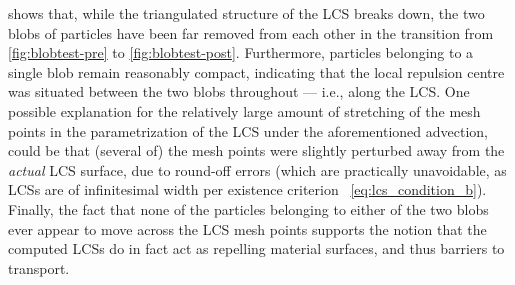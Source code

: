 

 shows that, while the triangulated structure of the LCS
breaks down, the two blobs of particles have been far removed from each other
in the transition from \cref{fig:blobtest-pre} to \cref{fig:blobtest-post}.
Furthermore, particles belonging to a single blob remain reasonably compact,
indicating that the local repulsion centre was situated between the two
blobs throughout --- i.e., along the LCS. One possible explanation
for the relatively large amount of stretching of the mesh points in the
parametrization of the LCS under the aforementioned advection, could be
that (several of) the mesh points were slightly perturbed away from
the \emph{actual} LCS surface, due to round-off errors (which are practically
unavoidable, as LCSs are of infinitesimal width per existence criterion%
~\eqref{eq:lcs_condition_b}). Finally, the fact that none of the particles
belonging to either of the two blobs ever appear to move across the
LCS mesh points supports the notion that the computed LCSs do in fact act as
repelling material surfaces, and thus barriers to transport.

